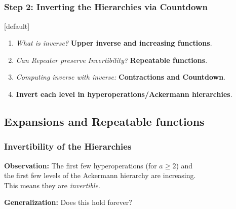 \subsection*{}
\begin{frame}
\frametitle{Step 2: Inverting the Hierarchies via \textbf{Countdown}}
[default]

\begin{enumerate}[\bfseries 1.]
	\itemsep 3ex
	\item<done@1->
	\emph{What is inverse?} \textbf{Upper inverse and increasing functions}.
	
	\item<come@2->
	\emph{Can Repeater preserve Invertibility?} \textbf{Repeatable functions}.
	
	\item
	\emph{Computing inverse with inverse:} \textbf{Contractions and Countdown}.
	
	\item
	\textbf{Invert each level in hyperoperations/Ackermann hierarchies}.
\end{enumerate}
\end{frame}


\subsection{Expansions and Repeatable functions}

\begin{frame}
\frametitle{Invertibility of the Hierarchies}

\textbf{Observation:} The first few hyperoperations (for $a\ge 2$) and \\ the first few levels of the Ackermann hierarchy are increasing. \\This means they are \emph{invertible}.

\bigskip

\pause 
\textbf{Generalization:} Does this hold forever?

\bigskip

\pause 
{}

%
%
\end{frame}


